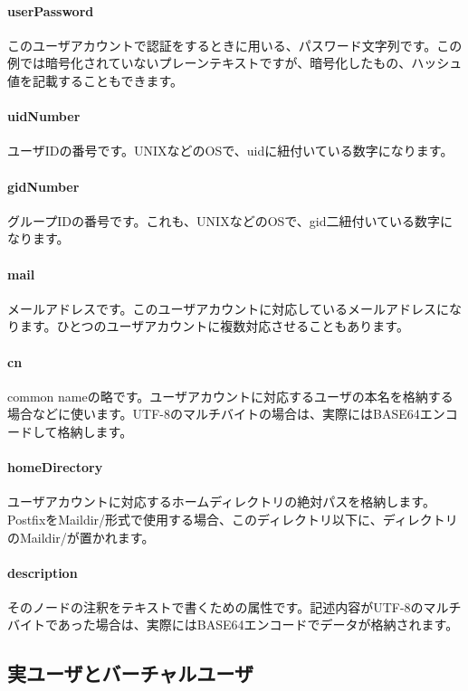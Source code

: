 \paragraph{userPassword}
このユーザアカウントで認証をするときに用いる、パスワード文字列です。この例では暗号化されていないプレーンテキストですが、暗号化したもの、ハッシュ値を記載することもできます。

\paragraph{uidNumber}
ユーザIDの番号です。UNIXなどのOSで、uidに紐付いている数字になります。

\paragraph{gidNumber}
グループIDの番号です。これも、UNIXなどのOSで、gid二紐付いている数字になります。

\paragraph{mail}
メールアドレスです。このユーザアカウントに対応しているメールアドレスになります。ひとつのユーザアカウントに複数対応させることもあります。

\paragraph{cn}
common nameの略です。ユーザアカウントに対応するユーザの本名を格納する場合などに使います。UTF-8のマルチバイトの場合は、実際にはBASE64エンコードして格納します。

\paragraph{homeDirectory}
ユーザアカウントに対応するホームディレクトリの絶対パスを格納します。PostfixをMaildir/形式で使用する場合、このディレクトリ以下に、ディレクトリのMaildir/が置かれます。

\paragraph{description}
そのノードの注釈をテキストで書くための属性です。記述内容がUTF-8のマルチバイトであった場合は、実際にはBASE64エンコードでデータが格納されます。

\subsection{実ユーザとバーチャルユーザ}

